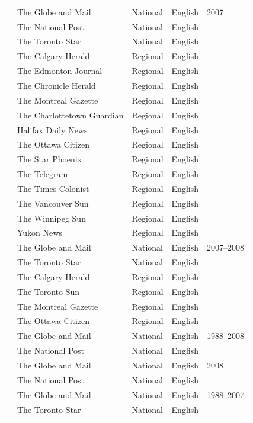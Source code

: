 \documentclass[12pt]{article}
\renewcommand\_{\texttt{\detokenize{_}\allowbreak}}
\begin{document}
{\begin{longtable}{p{5cm}p{6cm}p{4cm}p{3cm}p{3.5cm}}
\textcite{good_framing_2008} & The Globe and Mail & National & English & 2007 \\
& The National Post & National & English & \\
& The Toronto Star & National & English & \\
& The Calgary Herald & Regional & English & \\
& The Edmonton Journal & Regional & English & \\
& The Chronicle Herald & Regional & English & \\
& The Montreal Gazette & Regional & English & \\
& The Charlottetown Guardian & Regional & English & \\
& Halifax Daily News & Regional & English & \\
& The Ottawa Citizen & Regional & English & \\
& The Star Phoenix & Regional & English & \\
& The Telegram & Regional & English & \\
& The Times Colonist & Regional & English & \\
& The Vancouver Sun & Regional & English & \\
& The Winnipeg Sun & Regional & English & \\
& Yukon News & Regional & English & \\
\midrule
\textcite{rowe_comparing_2011} & The Globe and Mail & National & English & 2007--2008 \\
& The Toronto Star & National & English & \\
& The Calgary Herald & Regional & English & \\
& The Toronto Sun & Regional & English & \\
& The Montreal Gazette & Regional & English & \\
& The Ottawa Citizen & Regional & English & \\
\midrule
\textcite{young_representations_2011} & The Globe and Mail & National & English & 1988--2008 \\
& The National Post & National & English & \\
\midrule
\textcite{anne_difrancesco_seeing_2011} & The Globe and Mail & National & English & 2008 \\
& The National Post & National & English & \\
\midrule
\textcite{ahchong_anthropogenic_2012} & The Globe and Mail & National & English & 1988--2007 \\
& The Toronto Star & National & English & \\

\end{longtable}}
\end{document}
